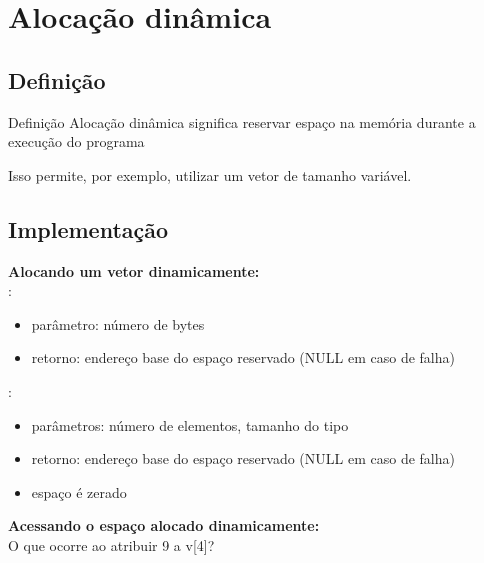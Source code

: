 \documentclass[portuguese,10pt,xcolor=table]{bredelebeamer}
\begin{document}
	\section{Alocação dinâmica}

	\begin{frame}
		\begin{center}
		\end{center}
	\end{frame} 

	\subsection{Definição}
	\begin{frame}
		\begin{beamerboxesrounded}{Definição}
			Alocação dinâmica significa reservar espaço na memória durante a execução do programa
		\end{beamerboxesrounded}
		\vspace{0.4cm}
		Isso permite, por exemplo, utilizar um vetor de tamanho variável.
	\end{frame}


	\subsection{Implementação}
	\begin{frame} 
		\textbf{Alocando um vetor dinamicamente:}\\
				
				\textdf{malloc}:
					\begin{itemize}
						\item parâmetro: número de bytes
						\item retorno: endereço base do espaço reservado (NULL em caso de falha)
					\end{itemize}
				\textdf{calloc}:
					\begin{itemize}
						\item parâmetros: número de elementos, tamanho do tipo
						\item retorno: endereço base do espaço reservado (NULL em caso de falha)
						\item espaço é zerado
					\end{itemize}
	\end{frame}

	\begin{frame} 
		\textbf{Acessando o espaço alocado dinamicamente:}\\
				
				O que ocorre ao atribuir 9 a v[4]?
	\end{frame}
	
\end{document}
